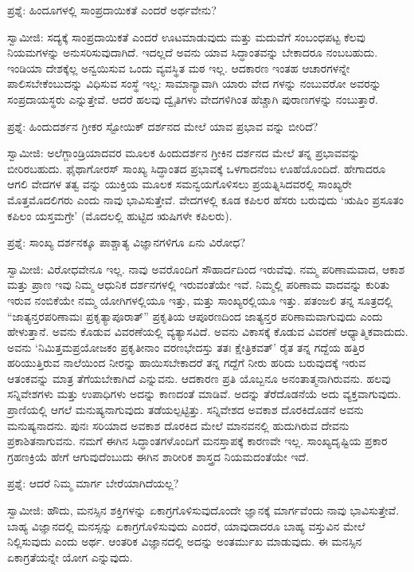 ಪ್ರಶ್ನೆ: ಹಿಂದೂಗಳಲ್ಲಿ ಸಾಂಪ್ರದಾಯಿಕತೆ ಎಂದರೆ ಅರ್ಥವೇನು?

ಸ್ವಾಮೀಜಿ: ಸದ್ಯಕ್ಕೆ ಸಾಂಪ್ರದಾಯಿಕತೆ ಎಂದರೆ ಊಟಮಾಡುವುದು ಮತ್ತು ಮದುವೆಗೆ ಸಂಬಂಧಪಟ್ಟ ಕೆಲವು ನಿಯಮಗಳನ್ನು ಅನುಸರಿಸುವುದಾಗಿದೆ. ಇದಲ್ಲದೆ ಅವನು ಯಾವ ಸಿದ್ಧಾಂತವನ್ನು ಬೇಕಾದರೂ ನಂಬಬಹುದು. ಇಂಡಿಯಾ ದೇಶಕ್ಕೆಲ್ಲ ಅನ್ವಯಿಸುವ ಒಂದು ವ್ಯವಸ್ಥಿತ ಮಠ ಇಲ್ಲ. ಆದಕಾರಣ ಇಂತಹ ಆಚಾರಗಳನ್ನೇ ಪಾಲಿಸಬೇಕೆಂಬುದನ್ನು ವಿಧಿಸುವ ಸಂಸ್ಥೆ ಇಲ್ಲ: ಸಾಮಾನ್ಯಾವಾಗಿ ಯಾರು ವೇದ ಗಳನ್ನು ನಂಬುವರೋ ಅವರನ್ನು ಸಂಪ್ರದಾಯಸ್ಥರು ಎನ್ನುತ್ತೇವೆ. ಆದರೆ ಹಲವು ದ್ವೈತಿಗಳು ವೇದಗಳಿಗಿಂತ ಹೆಚ್ಚಾಗಿ ಪುರಾಣಗಳನ್ನು ನಂಬುತ್ತಾರೆ.

ಪ್ರಶ್ನೆ: ಹಿಂದುದರ್ಶನ ಗ್ರೀಕರ ಸ್ಟೋಯಿಕ್​ ದರ್ಶನದ ಮೇಲೆ ಯಾವ ಪ್ರಭಾವ ವನ್ನು ಬೀರಿದೆ?

ಸ್ವಾಮೀಜಿ: ಅಲೆಗ್ಜಾಂಡ್ರಿಯಾದವರ ಮೂಲಕ ಹಿಂದುದರ್ಶನ ಗ್ರೀಕಿನ ದರ್ಶನದ ಮೇಲೆ ತನ್ನ ಪ್ರಭಾವವನ್ನು ಬೀರಿರಬಹುದು. ಫೈಥಾಗೋರಸ್​ ಸಾಂಖ್ಯ ಸಿದ್ಧಾಂತದ ಪ್ರಭಾವಕ್ಕೆ ಒಳಗಾದನೆಂಬ ಊಹೆಯೊಂದಿದೆ. ಹೇಗಾದರೂ ಆಗಲಿ ವೇದಗಳ ತತ್ವ ವನ್ನು ಯುಕ್ತಿಯ ಮೂಲಕ ಸಮನ್ವಯಗೊಳಿಸಲು ಪ್ರಯತ್ನಿಸಿದವರಲ್ಲಿ ಸಾಂಖ್ಯರೇ ಮೊತ್ತಮೊದಲಿಗರು ಎಂದು ನಾವು ಭಾವಿಸುತ್ತೇವೆ. ವೇದಗಳಲ್ಲಿ ಕೂಡ ಕಪಿಲರ ಹೆಸರು ಬರುವುದು ‘ಋಷಿಂ ಪ್ರಸೂತಂ ಕಪಿಲಂ ಯಸ್ತಮಗ್ರೇ’ (ಮೊದಲಲ್ಲಿ ಹುಟ್ಟಿದ ಋಷಿಗಳೇ ಕಪಿಲರು).

ಪ್ರಶ್ನೆ: ಸಾಂಖ್ಯ ದರ್ಶನಕ್ಕೂ ಪಾಶ್ಚಾತ್ಯ ವಿಜ್ಞಾನಗಳಿಗೂ ಏನು ವಿರೋಧ?

ಸ್ವಾಮೀಜಿ: ವಿರೋಧವೇನೂ ಇಲ್ಲ. ನಾವು ಅವರೊಂದಿಗೆ ಸೌಹಾರ್ದದಿಂದ ಇರುವೆವು. ನಮ್ಮ ಪರಿಣಾಮವಾದ, ಆಕಾಶ ಮತ್ತು ಪ್ರಾಣ ಇವು ನಿಮ್ಮ ಆಧುನಿಕ ದರ್ಶನಗಳಲ್ಲಿ ಇರುವಂತೆಯೇ ಇವೆ. ನಿಮ್ಮಲ್ಲಿ ಪರಿಣಾಮ ವಾದವನ್ನು ಕುರಿತು ಇರುವ ನಂಬಿಕೆಯೇ ನಮ್ಮ ಯೋಗಿಗಳಲ್ಲಿಯೂ ಇತ್ತು, ಮತ್ತು ಸಾಂಖ್ಯರಲ್ಲಿಯೂ ಇತ್ತು. ಪತಂಜಲಿ ತನ್ನ ಸೂತ್ರದಲ್ಲಿ “ಜಾತ್ಯನ್ತರಪರಿಣಾಮಃ ಪ್ರಕೃತ್ಯಾಪೂರಾತ್​” ಪ್ರಕೃತಿಯ ಆಪೂರಣದಿಂದ ಜಾತ್ಯನ್ತರ ಪರಿಣಾಮವಾಗುವುದು ಎಂದು ಹೇಳುತ್ತಾನೆ. ಅವನು ಕೊಡುವ ವಿವರಣೆಯಲ್ಲಿ ವ್ಯತ್ಯಾಸವಿದೆ. ಅವನು ವಿಕಾಸಕ್ಕೆ ಕೊಡುವ ವಿವರಣೆ ಆಧ್ಯಾತ್ಮಿಕವಾದುದು. ಅವನು ‘ನಿಮಿತ್ತಮಪ್ರಯೋಜಕಂ ಪ್ರಕೃತೀನಾಂ ವರಣಭೇದಸ್ತು ತತಃ ಕ್ಷೇತ್ರಿಕವತ್​’ ರೈತ ತನ್ನ ಗದ್ದೆಯ ಹತ್ತಿರ ಹರಿಯುತ್ತಿರುವ ನಾಲೆಯಿಂದ ನೀರನ್ನು ಹಾಯಿಸಬೇಕಾದರೆ ತನ್ನ ಗದ್ದೆಗೆ ನೀರು ಹರಿದು ಬರುವುದಕ್ಕೆ ಇರುವ ಆತಂಕವನ್ನು ಮಾತ್ರ ತೆಗೆಯಬೇಕಾಗಿದೆ ಎನ್ನುವನು. ಆದಕಾರಣ ಪ್ರತಿ ಯೊಬ್ಬನೂ ಅನಂತಾತ್ಮನಾಗಿರುವನು. ಹಲವು ಸನ್ನಿವೇಶಗಳು ಮತ್ತು ಉಪಾಧಿಗಳು ಅದನ್ನು ಕಾಣದಂತೆ ಮಾಡಿವೆ. ಅದನ್ನು ತೆರೆದೊಡನೆಯೆ ಅದು ವ್ಯಕ್ತವಾಗುವುದು. ಪ್ರಾಣಿಯಲ್ಲಿ ಆಗಲೆ ಮನುಷ್ಯನಾಗುವುದು ತಡೆಯಲ್ಪಟ್ಟಿತ್ತು. ಸನ್ನಿವೇಶದ ಅವಕಾಶ ದೊರಕಿದೊಡನೆ ಅವನು ಮನುಷ್ಯನಾದನು. ಪುನಃ ಸರಿಯಾದ ಅವಕಾಶ ದೊರಕಿದ ಮೇಲೆ ಮಾನವನಲ್ಲಿ ಹುದುಗಿರುವ ದೇವನು ಪ್ರಕಾಶಿತನಾಗುವನು. ನಮಗೆ ಈಗಿನ ಸಿದ್ಧಾಂತಗಳೊಂದಿಗೆ ಮನಸ್ತಾಪಕ್ಕೆ ಕಾರಣವೇ ಇಲ್ಲ. ಸಾಂಖ್ಯದೃಷ್ಟಿಯ ಪ್ರಕಾರ ಗ್ರಹಣಕ್ರಿಯೆ ಹೇಗೆ ಆಗುವುದೆಂಬುದು ಈಗಿನ ಶಾರೀರಿಕ ಶಾಸ್ತ್ರದ ನಿಯಮದಂತೆಯೇ ಇದೆ.

ಪ್ರಶ್ನೆ: ಆದರೆ ನಿಮ್ಮ ಮಾರ್ಗ ಬೇರೆಯಾಗಿದೆಯಲ್ಲ?

ಸ್ವಾಮೀಜಿ: ಹೌದು, ಮನಸ್ಸಿನ ಶಕ್ತಿಗಳನ್ನು ಏಕಾಗ್ರಗೊಳಿಸುವುದೊಂದೇ ಜ್ಞಾನಕ್ಕೆ ಮಾರ್ಗವೆಂದು ನಾವು ಭಾವಿಸುತ್ತೇವೆ. ಬಾಹ್ಯ ವಿಜ್ಞಾನದಲ್ಲಿ ಮನಸ್ಸನ್ನು ಏಕಾಗ್ರಗೊಳಿಸುವುದು ಎಂದರೆ, ಯಾವುದಾದರೂ ಬಾಹ್ಯ ವಸ್ತುವಿನ ಮೇಲೆ ನಿಲ್ಲಿಸುವುದು ಎಂದು ಅರ್ಥ. ಆಂತರಿಕ ವಿಜ್ಞಾನದಲ್ಲಿ ಅದನ್ನು ಅಂತರ್ಮುಖ ಮಾಡುವುದು. ಈ ಮನಸ್ಸಿನ ಏಕಾಗ್ರತೆಯನ್ನೇ ಯೋಗ ಎನ್ನುವುದು.

